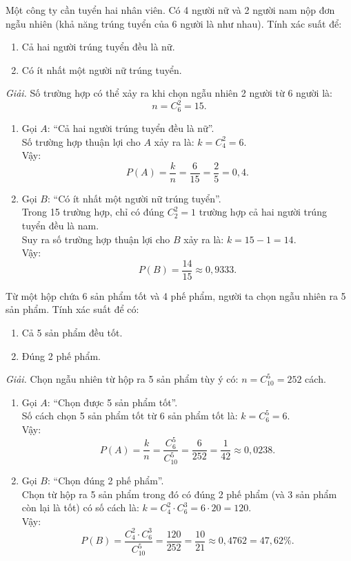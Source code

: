 \begin{vidu}
Một công ty cần tuyển hai nhân viên. Có 4 người nữ và 2 người nam nộp đơn ngẫu nhiên (khả năng trúng tuyển của 6 người là như nhau). Tính xác suất để:
\begin{enumerate}[label=\arabic*)]
    \item Cả hai người trúng tuyển đều là nữ.
    \item Có ít nhất một người nữ trúng tuyển.
\end{enumerate}
\textit{Giải.} 
Số trường hợp có thể xảy ra khi chọn ngẫu nhiên 2 người từ 6 người là:
\[
n = C_6^2 = 15.
\]
\begin{enumerate}[label=\arabic*)]
    \item Gọi $A$: ``Cả hai người trúng tuyển đều là nữ''.\\
    Số trường hợp thuận lợi cho $A$ xảy ra là: $k = C_4^2 = 6$.\\
    Vậy:
    \[
    P(A) = \frac{k}{n} = \frac{6}{15} = \frac{2}{5} = 0{,}4.
    \]
    \item Gọi $B$: ``Có ít nhất một người nữ trúng tuyển''.\\
    Trong 15 trường hợp, chỉ có đúng $C_2^2 = 1$ trường hợp cả hai người trúng tuyển đều là nam.\\
    Suy ra số trường hợp thuận lợi cho $B$ xảy ra là: $k = 15 - 1 = 14$.\\
    Vậy:
    \[
    P(B) = \frac{14}{15} \approx 0{,}9333.
    \]
\end{enumerate}
\end{vidu}

\begin{vidu}
Từ một hộp chứa 6 sản phẩm tốt và 4 phế phẩm, người ta chọn ngẫu nhiên ra 5 sản phẩm. Tính xác suất để có:
\begin{enumerate}[label=\arabic*)]
    \item Cả 5 sản phẩm đều tốt.
    \item Đúng 2 phế phẩm.
\end{enumerate}
\textit{Giải.} Chọn ngẫu nhiên từ hộp ra 5 sản phẩm tùy ý có: $n = C_{10}^5 = 252$ cách.
\begin{enumerate}[label=\arabic*)]
    \item Gọi $A$: ``Chọn được 5 sản phẩm tốt''.\\
    Số cách chọn 5 sản phẩm tốt từ 6 sản phẩm tốt là: $k = C_6^5 = 6$.\\
    Vậy:
    \[
    P(A) = \frac{k}{n} = \frac{C_6^5}{C_{10}^5} = \frac{6}{252} = \frac{1}{42} \approx 0{,}0238.
    \]
    \item Gọi $B$: ``Chọn đúng 2 phế phẩm''.\\
    Chọn từ hộp ra 5 sản phẩm trong đó có đúng 2 phế phẩm (và 3 sản phẩm còn lại là tốt) có số cách là: $k = C_4^2 \cdot C_6^3 = 6 \cdot 20 = 120$.\\
    Vậy:
    \[
    P(B) = \frac{C_4^2 \cdot C_6^3}{C_{10}^5} = \frac{120}{252} = \frac{10}{21} \approx 0{,}4762 = 47{,}62\%.
    \]
\end{enumerate}
\end{vidu}

